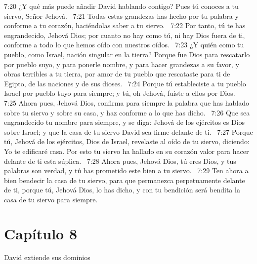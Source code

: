 7:20 ¿Y qué más puede añadir David hablando contigo? Pues tú conoces a tu siervo, Señor Jehová.  
7:21 Todas estas grandezas has hecho por tu palabra y conforme a tu corazón, haciéndolas saber a tu siervo.  
7:22 Por tanto, tú te has engrandecido, Jehová Dios; por cuanto no hay como tú, ni hay Dios fuera de ti, conforme a todo lo que hemos oído con nuestros oídos.  
7:23 ¿Y quién como tu pueblo, como Israel, nación singular en la tierra? Porque fue Dios para rescatarlo por pueblo suyo, y para ponerle nombre, y para hacer grandezas a su favor, y obras terribles a tu tierra, por amor de tu pueblo que rescataste para ti de Egipto, de las naciones y de sus dioses.  
7:24 Porque tú estableciste a tu pueblo Israel por pueblo tuyo para siempre; y tú, oh Jehová, fuiste a ellos por Dios.  
7:25 Ahora pues, Jehová Dios, confirma para siempre la palabra que has hablado sobre tu siervo y sobre su casa, y haz conforme a lo que has dicho.  
7:26 Que sea engrandecido tu nombre para siempre, y se diga: Jehová de los ejércitos es Dios sobre Israel; y que la casa de tu siervo David sea firme delante de ti.  
7:27 Porque tú, Jehová de los ejércitos, Dios de Israel, revelaste al oído de tu siervo, diciendo: Yo te edificaré casa. Por esto tu siervo ha hallado en su corazón valor para hacer delante de ti esta súplica.  
7:28 Ahora pues, Jehová Dios, tú eres Dios, y tus palabras son verdad, y tú has prometido este bien a tu siervo.  
7:29 Ten ahora a bien bendecir la casa de tu siervo, para que permanezca perpetuamente delante de ti, porque tú, Jehová Dios, lo has dicho, y con tu bendición será bendita la casa de tu siervo para siempre.  
\section*{Capítulo 8}
David extiende sus dominios  


